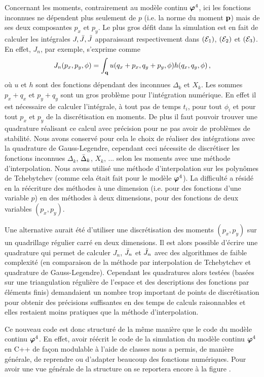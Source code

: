 \documentclass[10.5pt]{article}
\begin{document}
\begin{multicols}{2}
Concernant les moments, contrairement au modèle continu $\boldsymbol{ \varphi}^4$, ici les fonctions inconnues ne dépendent plus seulement de $p$ (i.e. la norme du moment ${\bf p}$) mais de ses deux composantes $p_x$ et $p_y$. Le plus gros défit dans la simulation est en fait de calculer les intégrales $J, \bar{J}, \tilde{J}$ apparaissant respectivement dans $(\mathcal{E}_1)$, $(\mathcal{E}_2)$ et $(\mathcal{E}_3)$. En effet, $J_n$, par exemple, s'exprime comme 
\begin{equation}
	J_n(p_x, p_y, \phi) = \int_{\bf q} u(q_x+p_x, q_y+p_y, \phi) h(q_x,q_y, \phi) \, ,
\end{equation}
où $u$ et $h$ sont des fonctions dépendant des inconnues $\Delta_k$ et $X_k$. Les sommes $p_x+q_x$ et $p_y+q_y$ sont un gros problème pour l'intégration numérique. En effet il est nécessaire de calculer l'intégrale, à tout pas de temps $t_i$, pour tout $\phi_i$ et pour tout $p_x$ et $p_y$ de la discrétisation en moments. De plus il faut pouvoir trouver une quadrature réalisant ce calcul avec précision pour ne pas avoir de problèmes de stabilité. Nous avons conservé pour cela le choix de réaliser des intégrations avec la quadrature de Gauss-Legendre, cependant ceci nécessite de discrétiser les fonctions inconnues $\Delta_k$, $\bar{\Delta}_k$, $X_k$, ... selon les moments avec une méthode d'interpolation. Nous avons utilisé une méthode d'interpolation sur les polynômes de Tchebytchev (comme cela était fait pour le modèle $\boldsymbol{ \varphi}^4$). La difficulté a résidé en la réécriture des méthodes à une dimension (i.e. pour des fonctions d'une variable $p$) en des méthodes à deux dimensions, pour des fonctions de deux variables $(p_x, p_y)$. 

Une alternative aurait été d'utiliser une discrétisation des moments $(p_x, p_y)$ sur un quadrillage régulier carré en deux dimensions. Il est alors possible d'écrire une quadrature qui permet de calculer $J_n$, $\bar{J}_n$ et $\tilde{J}_n$ avec des algorithmes de faible complexité (en comparaison de la méthode par interpolation de Tchebytchev et quadrature de Gauss-Legendre). Cependant les quadratures alors testées (basées sur une triangulation régulière de l'espace et des descriptions des fonctions par éléments finis)
 demandaient un nombre trop important de points de discrétisation pour obtenir des précisions suffisantes en des temps de calculs raisonnables et elles restaient moins pratiques que la méthode d'interpolation. 


Ce nouveau code est donc structuré de la même manière que le code du modèle continu $\boldsymbol{ \varphi}^4$. En effet, avoir réécrit le code de la simulation du modèle continu $\boldsymbol{ \varphi}^4$ en C++ de façon modulable à l'aide de classes nous a permis, de manière générale, de reprendre ou d'adapter beaucoup des fonctions numériques. Pour avoir une vue générale de la structure on se reportera encore à la figure . 


\end{multicols}
\end{document}
